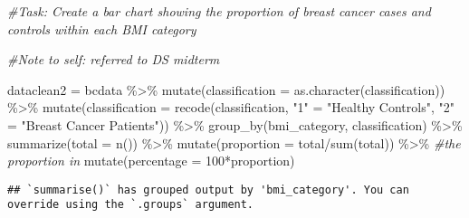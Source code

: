 \documentclass[
]{article}
\newenvironment{Shaded}{\begin{snugshade}}{\end{snugshade}}
\newcommand{\AttributeTok}[1]{\textcolor[rgb]{0.77,0.63,0.00}{#1}}
\newcommand{\CommentTok}[1]{\textcolor[rgb]{0.56,0.35,0.01}{\textit{#1}}}
\newcommand{\DecValTok}[1]{\textcolor[rgb]{0.00,0.00,0.81}{#1}}
\newcommand{\FunctionTok}[1]{\textcolor[rgb]{0.00,0.00,0.00}{#1}}
\newcommand{\NormalTok}[1]{#1}
\newcommand{\OtherTok}[1]{\textcolor[rgb]{0.56,0.35,0.01}{#1}}
\newcommand{\SpecialCharTok}[1]{\textcolor[rgb]{0.00,0.00,0.00}{#1}}
\newcommand{\StringTok}[1]{\textcolor[rgb]{0.31,0.60,0.02}{#1}}
\begin{document}
\begin{Shaded}
\begin{Highlighting}[]
\CommentTok{\#Task: Create a bar chart showing the proportion of breast cancer cases and controls within each BMI category}

\CommentTok{\#Note to self: referred to DS midterm}

\NormalTok{dataclean2 }\OtherTok{=}\NormalTok{ bcdata }\SpecialCharTok{\%\textgreater{}\%} 
  \FunctionTok{mutate}\NormalTok{(}\AttributeTok{classification =} \FunctionTok{as.character}\NormalTok{(classification)) }\SpecialCharTok{\%\textgreater{}\%}
  \FunctionTok{mutate}\NormalTok{(}\AttributeTok{classification =} \FunctionTok{recode}\NormalTok{(classification,}
                       \StringTok{"1"} \OtherTok{=} \StringTok{"Healthy Controls"}\NormalTok{,}
                       \StringTok{"2"} \OtherTok{=} \StringTok{"Breast Cancer Patients"}\NormalTok{)) }\SpecialCharTok{\%\textgreater{}\%} 
  \FunctionTok{group\_by}\NormalTok{(bmi\_category, classification) }\SpecialCharTok{\%\textgreater{}\%}
  \FunctionTok{summarize}\NormalTok{(}\AttributeTok{total =} \FunctionTok{n}\NormalTok{()) }\SpecialCharTok{\%\textgreater{}\%}
  \FunctionTok{mutate}\NormalTok{(}\AttributeTok{proportion =}\NormalTok{ total}\SpecialCharTok{/}\FunctionTok{sum}\NormalTok{(total)) }\SpecialCharTok{\%\textgreater{}\%} \CommentTok{\#the proportion in }
  \FunctionTok{mutate}\NormalTok{(}\AttributeTok{percentage =} \DecValTok{100}\SpecialCharTok{*}\NormalTok{proportion)}
\end{Highlighting}
\end{Shaded}

\begin{verbatim}
## `summarise()` has grouped output by 'bmi_category'. You can override using the `.groups` argument.
\end{verbatim}
\end{document}
